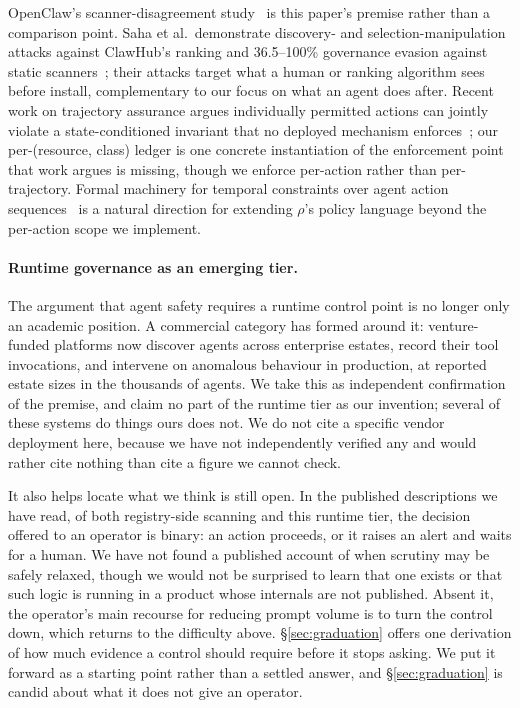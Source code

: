 \documentclass[10pt]{article}
\begin{document}
OpenClaw's scanner-disagreement study~\cite{clawhubsignals} is this paper's premise
rather than a comparison point. Saha et al.\ demonstrate discovery- and
selection-manipulation attacks against ClawHub's ranking and 36.5--100\% governance
evasion against static scanners~\cite{skillmd2026}; their attacks target what a
human or ranking algorithm sees before install, complementary to our focus on what
an agent does after. Recent work on trajectory assurance argues individually
permitted actions can jointly violate a state-conditioned invariant that no deployed
mechanism enforces~\cite{trajectory2026}; our per-(resource, class) ledger is one
concrete instantiation of the enforcement point that work argues is missing, though
we enforce per-action rather than per-trajectory. Formal machinery for temporal
constraints over agent action sequences~\cite{temporal2026} is a natural direction
for extending $\rho$'s policy language beyond the per-action scope we implement.

\paragraph{Runtime governance as an emerging tier.} The argument that agent safety
requires a runtime control point is no longer only an academic position. A
commercial category has formed around it: venture-funded platforms now discover
agents across enterprise estates, record their tool invocations, and intervene on
anomalous behaviour in production, at reported estate sizes in the thousands of
agents. We take this as independent confirmation of the premise, and claim no part of
the runtime tier as our invention; several of these systems do things ours does not.
We do not cite a specific vendor deployment here, because we have not independently
verified any and would rather cite nothing than cite a figure we cannot check.

It also helps locate what we think is still open. In the published descriptions we
have read, of both registry-side scanning and this runtime tier, the decision offered
to an operator is binary: an action proceeds, or it raises an alert and waits for a
human. We have not found a published account of when scrutiny may be safely relaxed,
though we would not be surprised to learn that one exists or that such logic is
running in a product whose internals are not published. Absent it, the operator's
main recourse for reducing prompt volume is to turn the control down, which returns
to the difficulty above. \S\ref{sec:graduation} offers one derivation of how much
evidence a control should require before it stops asking. We put it forward as a
starting point rather than a settled answer, and \S\ref{sec:graduation} is candid
about what it does not give an operator.
\end{document}
